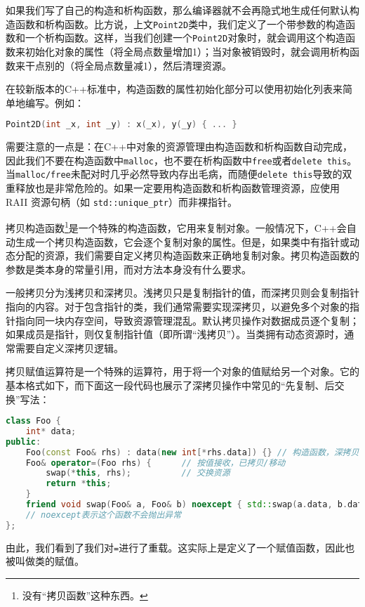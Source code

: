 如果我们写了自己的构造和析构函数，那么编译器就不会再隐式地生成任何默认构造函数和析构函数。比方说，上文\texttt{Point2D}类中，我们定义了一个带参数的构造函数和一个析构函数。这样，当我们创建一个\texttt{Point2D}对象时，就会调用这个构造函数来初始化对象的属性（将全局点数量增加1）；当对象被销毁时，就会调用析构函数来干点别的（将全局点数量减1），然后清理资源。

在较新版本的C++标准中，构造函数的属性初始化部分可以使用初始化列表来简单地编写。例如：
\begin{lstlisting}[language=C++]
Point2D(int _x, int _y) : x(_x), y(_y) { ... }
\end{lstlisting}

\begin{note}
  需要注意的一点是：在C++中对象的资源管理由构造函数和析构函数自动完成，因此我们不要在构造函数中\texttt{malloc}，也不要在析构函数中\texttt{free}或者\texttt{delete this}。当\texttt{malloc/free}未配对时几乎必然导致内存出毛病，而随便\texttt{delete this}导致的双重释放也是非常危险的。如果一定要用构造函数和析构函数管理资源，应使用 RAII 资源句柄（如 \texttt{std::unique\_ptr}）而非裸指针。
\end{note}

拷贝构造函数\footnote{没有“拷贝函数”这种东西。}是一个特殊的构造函数，它用来复制对象。一般情况下，C++会自动生成一个拷贝构造函数，它会逐个复制对象的属性。但是，如果类中有指针或动态分配的资源，我们需要自定义拷贝构造函数来正确地复制对象。拷贝构造函数的参数是类本身的常量引用，而对方法本身没有什么要求。

一般拷贝分为浅拷贝和深拷贝。浅拷贝只是复制指针的值，而深拷贝则会复制指针指向的内容。对于包含指针的类，我们通常需要实现深拷贝，以避免多个对象的指针指向同一块内存空间，导致资源管理混乱。默认拷贝操作对数据成员逐个复制；如果成员是指针，则仅复制指针值（即所谓“浅拷贝”）。当类拥有动态资源时，通常需要自定义深拷贝逻辑。

拷贝赋值运算符是一个特殊的运算符，用于将一个对象的值赋给另一个对象。它的基本格式如下，而下面这一段代码也展示了深拷贝操作中常见的“先复制、后交换”写法：
\begin{lstlisting}[language=C++]
class Foo {
    int* data;
public:
    Foo(const Foo& rhs) : data(new int[*rhs.data]) {} // 构造函数，深拷贝
    Foo& operator=(Foo rhs) {      // 按值接收，已拷贝/移动
        swap(*this, rhs);          // 交换资源
        return *this;
    }
    friend void swap(Foo& a, Foo& b) noexcept { std::swap(a.data, b.data); }
    // noexcept表示这个函数不会抛出异常
};
\end{lstlisting}
由此，我们看到了我们对\texttt{=}进行了重载。这实际上是定义了一个赋值函数，因此也被叫做类的赋值。

